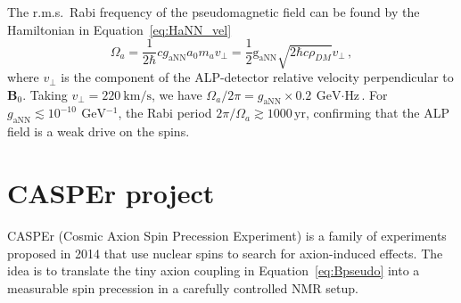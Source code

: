 The r.m.s.\ Rabi frequency of the pseudomagnetic field can be found by the Hamiltonian in Equation~\eqref{eq:HaNN_vel} \cite{Centers2021Stochastic,Yuzhe2023_FrequencyScanning}
\begin{equation}
    \Omega_a = \dfrac{1}{2\hbar} c g_\mathrm{{aNN}} a_0 m_a v_{\bot} = \dfrac{1}{2} \mathrm{g_{aNN}} \sqrt{2\hbar c \rho_{DM}} v_{\bot}
    \,,\label{eq:Omega_a}
\end{equation}
where $v_{\bot}$ is the component of the ALP-detector relative velocity perpendicular to $\mathbf{B}_0$.
Taking $v_{\bot} = \SI{220}{\km\per\second}$, we have $\Omega_a/2\pi = g_{\mathrm{aNN}} \times \SI{0.2}{\GeV\cdot\Hz}$.
For $g_{\mathrm{aNN}} \lesssim 10^{-10}\,\SI{}{\GeV^{-1}}$, the Rabi period $2\pi/\Omega_a \gtrsim 1000\,\mathrm{yr}$, confirming that the ALP field is a weak drive on the spins.







\section{CASPEr project}\label{sec:intro:CASPEr}


CASPEr (Cosmic Axion Spin Precession Experiment) is a family of experiments proposed in 2014 \cite{CASPErProposal2014} that use nuclear spins to search for axion-induced effects.
The idea is to translate the tiny axion coupling in Equation~\eqref{eq:Bpseudo} into a measurable spin precession in a carefully controlled NMR setup.

